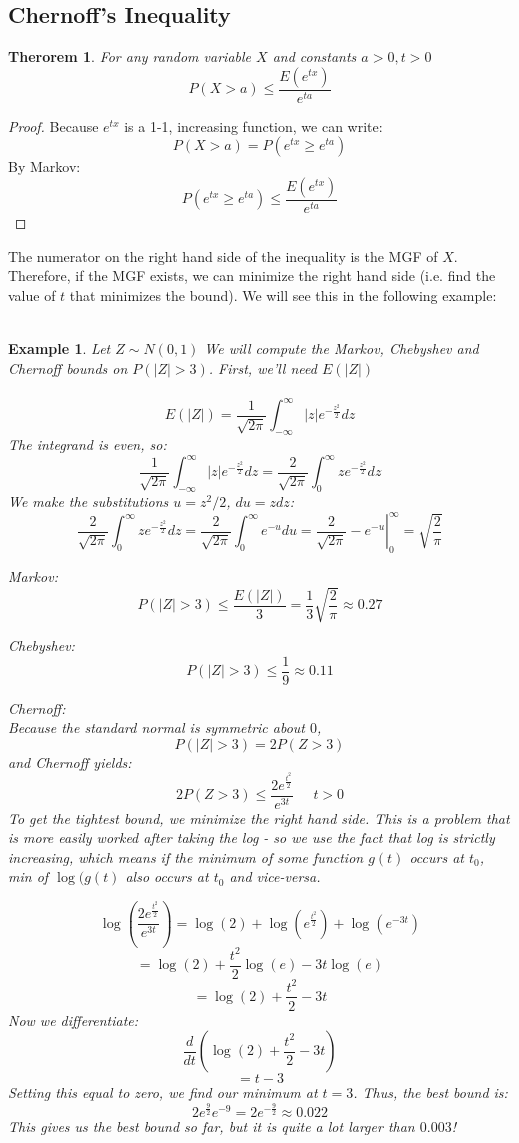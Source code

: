 \documentclass[12pt]{article} %
\newcommand{\infi}{\int_{-\infty}^\infty}
\newtheorem{example}{Example}
\newtheorem{thm}{Therorem}
\begin{document}
\subsection{Chernoff's Inequality}
\begin{thm}
For any random variable $X$ and constants $a>0,t>0$
$$P(X>a)\leq \frac{E(e^{tx})}{e^{ta}}$$
\end{thm}
\begin{proof}
Because $e^{tx}$ is a 1-1, increasing function, we can write:
$$P(X>a) = P(e^{tx} \geq e^{ta})$$
By Markov:
$$ P(e^{tx} \geq e^{ta}) \leq \frac{E(e^{tx})}{e^{ta}}$$
\end{proof}
The numerator on the right hand side of the inequality is the MGF of $X$. Therefore, if the MGF exists, we can minimize the right hand side (i.e. find the value of $t$ that minimizes the bound). We will see this in the following example:\\\\
\begin{example}
Let $Z\sim N(0,1)$ We will compute the Markov, Chebyshev and Chernoff bounds on $P(|Z|>3)$. First, we'll need $E(|Z|)$\\\\

$$E(|Z|) =\frac1{\sqrt{2\pi}} \infi |z|e^{-\frac{z^2}{2}} dz$$
The integrand is even, so:
$$\frac1{\sqrt{2\pi}} \infi |z|e^{-\frac{z^2}{2}} dz = \frac2{\sqrt{2\pi}} \int_0^\infty ze^{-\frac{z^2}{2}} dz$$
We make the substitutions $u=z^2/2$, $du=zdz$:
$$\frac2{\sqrt{2\pi}} \int_0^\infty ze^{-\frac{z^2}{2}} dz = \frac2{\sqrt{2\pi}} \int_0^\infty e^{-u} du = \left. \frac2{\sqrt{2\pi}} -e^{-u}\right\rvert_0^\infty =\sqrt{\frac{2}{\pi}} $$

Markov: \\
$$P(|Z|>3) \leq \frac{E(|Z|)}{3}= \frac{1}{3}\sqrt{\frac{2}{\pi}} \approx 0.27$$

Chebyshev: \\
$$P(|Z|>3) \leq \frac19 \approx 0.11$$

Chernoff: \\

Because the standard normal is symmetric about $0$, 
$$P(|Z|>3) = 2P(Z>3)$$
and Chernoff yields:
$$2P(Z>3) \leq \frac{2e^{\frac{t^2}2}}{e^{3t}} \;\;\;\;\; t>0$$
To get the tightest bound, we minimize the right hand side. This is a problem that is more easily worked after taking the log - so we use the fact that log is strictly increasing, which means if the minimum of some function $g(t)$ occurs at $t_0$, min of $\log(g(t)$ also occurs at $t_0$ and vice-versa.

$$\log\left(\frac{2e^{\frac{t^2}2}}{e^{3t}}\right) = \log(2) + \log(e^{\frac{t^2}{2}}) + \log(e^{-3t})$$
$$ = \log(2) + \frac{t^2}{2}\log(e) - 3t\log(e)$$
$$ = \log(2) + \frac{t^2}{2} -3t$$
Now we differentiate:
$$\frac{d}{dt}\left(\log(2) + \frac{t^2}{2} -3t\right)$$
$$= t-3$$
Setting this equal to zero, we find our minimum at $t=3$. Thus, the best bound is:
$$2e^{\frac92}e^{-9} = 2e^{-\frac92} \approx 0.022$$
This gives us the best bound so far, but it is quite a lot larger than $0.003$!
\end{example}
\end{document}
